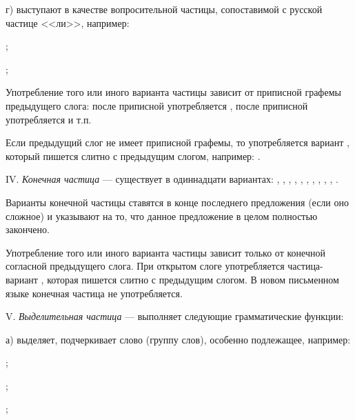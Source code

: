 г) выступают в качестве вопросительной частицы, сопоставимой с русской частице <<ли>>, например:
\begin{prfsample}
	\item {};
	\item {};
\end{prfsample}

Употребление того или иного варианта частицы зависит от приписной графемы предыдущего слога: после приписной  употребляется , после приписной  употребляется  и т.п.

Если предыдущий слог не имеет приписной графемы, то употребляется вариант , который пишется слитно с предыдущим слогом, например: .

IV. \emph{Конечная частица} --- существует в одиннадцати вариантах:
, , ,
, , ,
, , ,
, .

Варианты конечной частицы ставятся в конце последнего предложения (если оно сложное) и указывают на то, что данное предложение в целом полностью закончено.

Употребление того или иного варианта частицы зависит только от конечной согласной предыдущего слога. При открытом слоге употребляется частица-вариант , которая пишется слитно с предыдущим слогом. В новом письменном языке конечная частица не употребляется.

V. \emph{Выделительная частица}  --- выполняет следующие грамматические функции:

а) выделяет, подчеркивает слово (группу слов), особенно подлежащее, например:
\begin{prfsample}
	\item {};
	\item {};
	\item {};
\end{prfsample}

